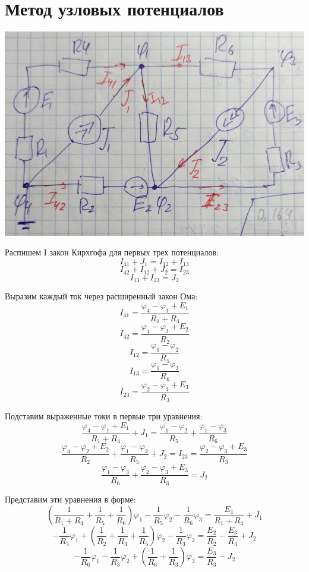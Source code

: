 \documentclass[14pt, a4paper]{article}
\begin{document}
\section*{Метод узловых потенциалов}
    \includegraphics[width=1\textwidth]{myp.jpg}

    Распишем I закон Кирхгофа для первых трех потенциалов:
    $$I_{41} + J_1 = I_{12} + I_{13}$$
    $$I_{42} + I_{12} + J_2 = I_23$$
    $$I_{13} + I_{23} = J_2$$

    Выразим каждый ток через расширенный закон Ома:
    $$I_{41} = \frac{\varphi_4 - \varphi_1 + E_1}{R_1 + R_4}$$
    $$I_{42} = \frac{\varphi_4 - \varphi_2 + E_2}{R_2}$$
    $$I_{12} = \frac{\varphi_1 - \varphi_2}{R_5}$$
    $$I_{13} = \frac{\varphi_1 - \varphi_3}{R_6}$$
    $$I_{23} = \frac{\varphi_2 - \varphi_3 + E_3}{R_3}$$


    Подставим выраженные токи в первые три уравнения:
    $$\frac{\varphi_4 - \varphi_1 + E_1}{R_1 + R_4} + J_1 = \frac{\varphi_1 - \varphi_2}{R_5} + \frac{\varphi_1 - \varphi_3}{R_6}$$
    $$\frac{\varphi_4 - \varphi_2 + E_2}{R_2} + \frac{\varphi_1 - \varphi_2}{R_5} + J_2 = I_{23} = \frac{\varphi_2 - \varphi_3 + E_3}{R_3}$$
    $$\frac{\varphi_1 - \varphi_3}{R_6} + \frac{\varphi_2 - \varphi_3 + E_3}{R_3} = J_2$$

    Представим эти уравнения в форме:
    $$(\frac{1}{R_1 +R_4} + \frac1{R_5} + \frac1{R_6}) \varphi_1 - \frac{1}{R_5}\varphi_2 - \frac1{R_6}\varphi_3 = \frac{E_1}{R_1 + R_4} + J_1$$
    $$-\frac1{R_5}\varphi_1 + (\frac1{R_2} + \frac1{R_3} + \frac1{R_5})\varphi_2 - \frac1{R_3}\varphi_3 = \frac{E_2}{R_2} - \frac{E_3}{R_3} + J_2$$
    $$-\frac1{R_6}\varphi_1 - \frac1{R_3}\varphi_2 + (\frac1{R_6} + \frac1{R_3})\varphi_3 = \frac{E_3}{R_3} - J_2$$
\end{document}
